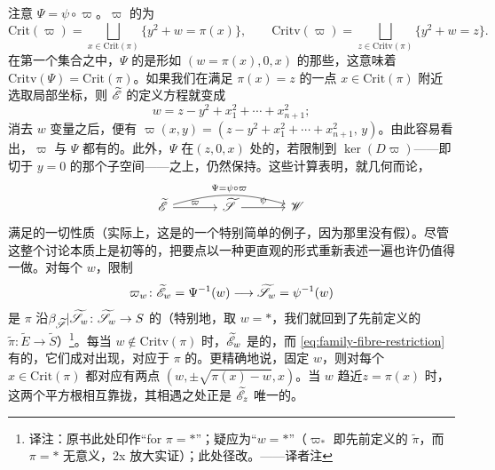注意 $\Psi=\psi\circ\varpi$。$\varpi$ 的\trSingularPoint{}为
\begin{equation}\label{eq:family-crit-sets}
\mathrm{Crit}(\varpi)=\bigsqcup_{x\in\mathrm{Crit}(\pi)}\{y^2+w=\pi(x)\},\qquad
\mathrm{Critv}(\varpi)=\bigsqcup_{z\in\mathrm{Critv}(\pi)}\{y^2+w=z\}.
\end{equation}
在第一个集合之中，$\Psi$ 的\trCriticalPoint{}是形如 $(w=\pi(x),0,x)$ 的那些，这意味着 $\mathrm{Critv}(\Psi)=\mathrm{Crit}(\pi)$。如果我们在满足 $\pi(x)=z$ 的一点 $x\in\mathrm{Crit}(\pi)$ 附近选取局部\trHolomorphic{}\trMorse{}坐标，则 $\widetilde{\mathscr{E}}$ 的定义方程就变成
\begin{equation}\label{eq:local-morse-equation}
w=z-y^2+x_1^2+\cdots+x_{n+1}^2;
\end{equation}
消去 $w$ 变量之后，便有 $\varpi(x,y)=(z-y^2+x_1^2+\cdots+x_{n+1}^2,\,y)$。由此容易看出，$\varpi$ 与 $\Psi$ 都有\trGeneric{}的\trCriticalPoint。此外，$\Psi$ 在\trCriticalPoint{}$(z,0,x)$ 处的\trHessian，若限制到 $\ker(D\varpi)$——即切于 $y=0$ 的那个子空间——之上，仍然保持\trNondegenerate。这些计算表明，就\trAlmostComplex{}几何而论，
\begin{equation}\label{eq:family-bifibration-diagram}
\begin{tikzcd}[column sep=large]
\widetilde{\scr{E}} \ar[r,"\varpi"] \ar[rr,bend left=16,"{\Psi=\psi\circ\varpi}"]
 & \widetilde{\scr{S}} \ar[r,"\psi"] & \scr{W}
\end{tikzcd}
\end{equation}
满足\trLefschetz\trBifibration{}的一切性质（实际上，这是\trBifibration{}的一个特别简单的例子，因为那里没有假\trCriticalPoint）。尽管这整个讨论本质上是初等的，把要点以一种更直观的形式重新表述一遍也许仍值得一做。对每个 $w$，限制
\begin{equation}\label{eq:family-fibre-restriction}
\varpi_w\colon\widetilde{\mathscr{E}}_w=\Psi^{-1}(w)\longrightarrow\widetilde{\mathscr{S}}_w=\psi^{-1}(w)
\end{equation}
是 $\pi$ 沿\trDoubleBranchedCover{}$\beta_{\widetilde{\mathscr{S}}}|\widetilde{\mathscr{S}}_w\colon\widetilde{\mathscr{S}}_w\to S$ 的\trPullback（特别地，取 $w=*$，我们就回到了先前定义的 $\tilde{\pi}\colon\widetilde{E}\to\widetilde{S}$）\footnote{译注：原书此处印作“for $\pi=*$”；疑应为“$w=*$”（$\varpi_*$ 即先前定义的 $\tilde{\pi}$，而 $\pi=*$ 无意义，2x 放大实证）；此处径改。——译者注}。每当 $w\notin\mathrm{Critv}(\pi)$ 时，$\widetilde{\mathscr{E}}_w$ 是\trSmooth{}的，而 \eqref{eq:family-fibre-restriction} 有\trGeneric{}的\trCriticalPoint，它们成对出现，对应于 $\pi$ 的\trCriticalPoint。更精确地说，固定 $w$，则对每个 $x\in\mathrm{Crit}(\pi)$ 都对应有两点 $(w,\pm\sqrt{\pi(x)-w},x)$。当 $w$ 趋近\trCriticalValue{}$z=\pi(x)$ 时，这两个平方根相互靠拢，其相遇之处正是 $\widetilde{\mathscr{E}}_z$ 唯一的\trSingularPoint。
